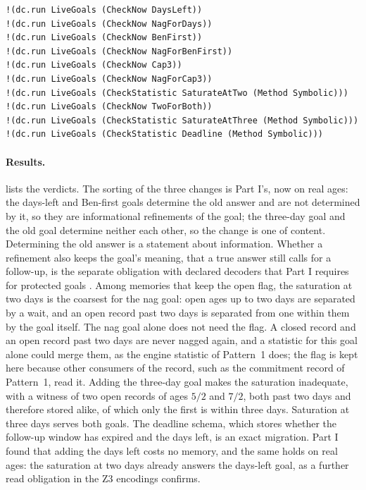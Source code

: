 \documentclass[11pt]{article}
\theoremstyle{definition}
\theoremstyle{plain}
\begin{document}
\begin{lstlisting}[style=mettamod]
!(dc.run LiveGoals (CheckNow DaysLeft))
!(dc.run LiveGoals (CheckNow NagForDays))
!(dc.run LiveGoals (CheckNow BenFirst))
!(dc.run LiveGoals (CheckNow NagForBenFirst))
!(dc.run LiveGoals (CheckNow Cap3))
!(dc.run LiveGoals (CheckNow NagForCap3))
!(dc.run LiveGoals (CheckStatistic SaturateAtTwo (Method Symbolic)))
!(dc.run LiveGoals (CheckNow TwoForBoth))
!(dc.run LiveGoals (CheckStatistic SaturateAtThree (Method Symbolic)))
!(dc.run LiveGoals (CheckStatistic Deadline (Method Symbolic)))
\end{lstlisting}

\paragraph{Results.}  lists the verdicts. The sorting of the three changes is Part
I's, now on real ages: the days-left and Ben-first goals determine the old answer and are not
determined by it, so they are informational refinements of the goal; the three-day goal and the old
goal determine neither each other, so the change is one of content. Determining the old answer is a
statement about information. Whether a refinement also keeps the goal's meaning, that a true answer
still calls for a follow-up, is the separate obligation with declared decoders that Part I requires
for protected goals \cite[Section~8.5]{part1}. Among memories that keep the open flag, the saturation
at two days is the coarsest for the nag goal: open ages up to two days are separated by a wait, and
an open record past two days is separated from one within them by the goal itself. The nag goal
alone does not need the flag. A closed record and an open record past two days are never nagged
again, and a statistic for this goal alone could merge them, as the engine statistic of Pattern~1
does; the flag is kept here because other consumers of the record, such as the commitment record of
Pattern~1, read it. Adding the three-day goal makes the saturation inadequate, with a witness of two
open records of ages $5/2$ and $7/2$, both past two days and therefore stored alike, of which only
the first is within three days. Saturation at three days serves both goals. The deadline schema,
which stores whether the follow-up window has expired and the days left, is an exact migration. Part
I found that adding the days left costs no memory, and the same holds on real ages: the saturation
at two days already answers the days-left goal, as a further read obligation in the Z3 encodings
confirms.
\end{document}

